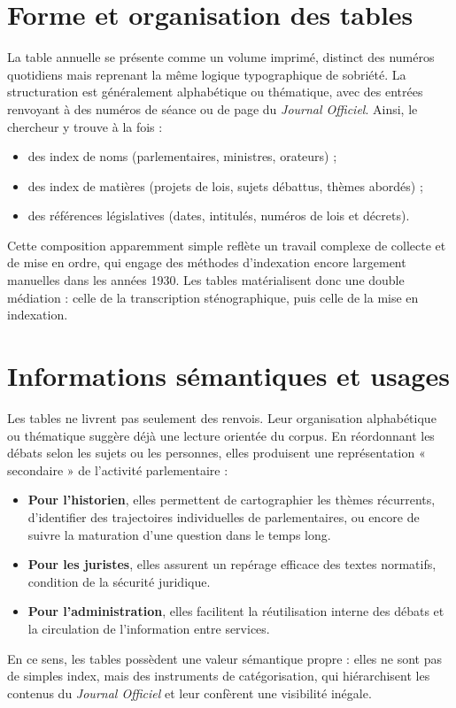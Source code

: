 \section{Forme et organisation des tables}

La table annuelle se présente comme un volume imprimé, distinct des numéros quotidiens mais reprenant la même logique typographique de sobriété. La structuration est généralement alphabétique ou thématique, avec des entrées renvoyant à des numéros de séance ou de page du \emph{Journal Officiel}. Ainsi, le chercheur y trouve à la fois :

\begin{itemize}
\item des index de noms (parlementaires, ministres, orateurs) ;
\item des index de matières (projets de lois, sujets débattus, thèmes abordés) ;
\item des références législatives (dates, intitulés, numéros de lois et décrets).

\end{itemize}
Cette composition apparemment simple reflète un travail complexe de collecte et de mise en ordre, qui engage des méthodes d’indexation encore largement manuelles dans les années 1930. Les tables matérialisent donc une double médiation : celle de la transcription sténographique, puis celle de la mise en indexation.

\section{Informations sémantiques et usages}

Les tables ne livrent pas seulement des renvois. Leur organisation alphabétique ou thématique suggère déjà une lecture orientée du corpus. En réordonnant les débats selon les sujets ou les personnes, elles produisent une représentation « secondaire » de l’activité parlementaire :

\begin{itemize}
\item \textbf{Pour l’historien}, elles permettent de cartographier les thèmes récurrents, d’identifier des trajectoires individuelles de parlementaires, ou encore de suivre la maturation d’une question dans le temps long.
\item \textbf{Pour les juristes}, elles assurent un repérage efficace des textes normatifs, condition de la sécurité juridique.
\item \textbf{Pour l’administration}, elles facilitent la réutilisation interne des débats et la circulation de l’information entre services.

\end{itemize}
En ce sens, les tables possèdent une valeur sémantique propre : elles ne sont pas de simples index, mais des instruments de catégorisation, qui hiérarchisent les contenus du \emph{Journal Officiel} et leur confèrent une visibilité inégale.

